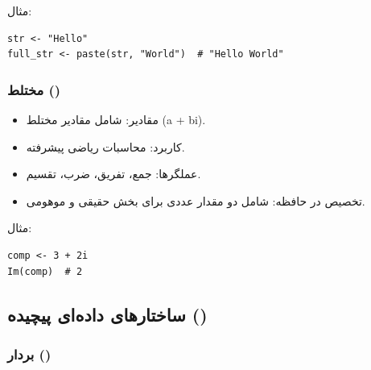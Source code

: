 \documentclass[11pt, a4paper, oneside]{book}
\begin{document}
					مثال:
					
					\begin{latin}
						\begin{lstlisting}[caption={\lr{Character data type}}] 
str <- "Hello"
full_str <- paste(str, "World")  # "Hello World"

						\end{lstlisting}
					\end{latin}
				
				\subsubsection{مختلط ()}
				
					\begin{itemize}
						
						\item {\large مقادیر}:
						{\normalsize  شامل مقادیر مختلط (a + bi).}
						
						\item {\large کاربرد}:
						{\normalsize محاسبات ریاضی پیشرفته.}
						
						\item {\large عملگرها}:
						{\normalsize جمع، تفریق، ضرب، تقسیم.}
						
						\item {\large تخصیص در حافظه}:
						{\normalsize شامل دو مقدار عددی برای بخش حقیقی و موهومی.}
						
					\end{itemize}
					
					مثال:
					
					\begin{latin}
						\begin{lstlisting}[caption={\lr{Complex data type}}] 
comp <- 3 + 2i
Im(comp)  # 2

						\end{lstlisting}
					\end{latin}
				
			\subsection{ساختارهای داده‌ای پیچیده ()}
			
				\subsubsection{بردار ()}
				
\end{document}
